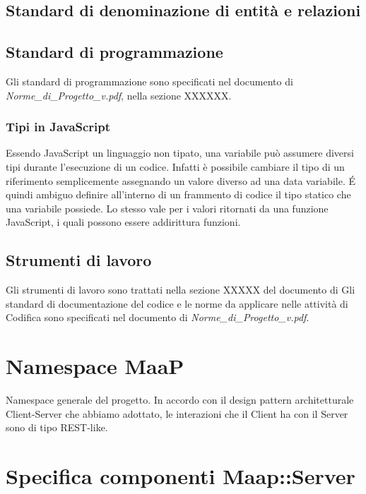 \subsection{Standard di denominazione di entità e relazioni}

\subsection{Standard di programmazione}
Gli standard di programmazione sono specificati nel documento di 
\emph{Norme\_{}di\_{}Progetto\_{}v\versioneNormeDiProgetto{}.pdf}, nella sezione XXXXXX.	%
\subsubsection{Tipi in JavaScript}
Essendo JavaScript un linguaggio non tipato, una variabile può assumere diversi tipi durante l'esecuzione
di un codice. Infatti è possibile cambiare il tipo di un riferimento semplicemente assegnando un valore diverso ad
una data variabile. \'{E} quindi ambiguo definire all'interno di un frammento di codice il tipo statico che una variabile
possiede. Lo stesso vale per i valori ritornati da una funzione JavaScript, i quali possono essere addirittura funzioni.

\subsection{Strumenti di lavoro}
Gli strumenti di lavoro sono trattati nella sezione XXXXX del documento di					%
Gli standard di documentazione del codice e le norme da applicare nelle attività 
di Codifica sono specificati nel documento di 
\emph{Norme\_{}di\_{}Progetto\_{}v\versioneNormeDiProgetto{}.pdf}.


\newpage

\section{Namespace MaaP}
Namespace generale del progetto. In accordo con il design pattern architetturale Client-Server che 
abbiamo adottato, le interazioni che il Client ha con il Server sono di tipo REST-like.

\section{Specifica componenti Maap::Server}

